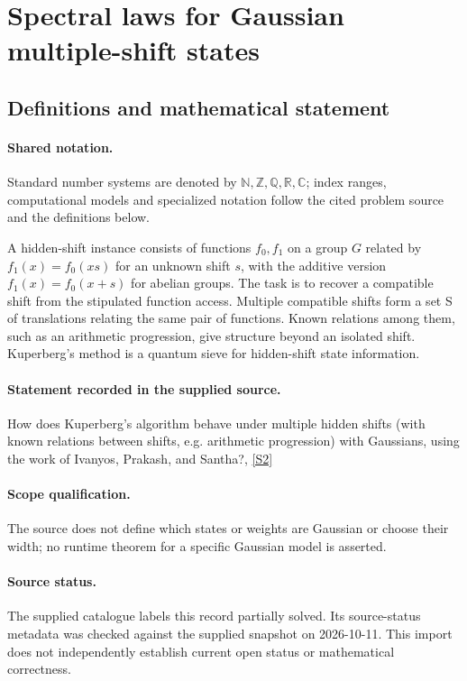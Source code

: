 \documentclass[11pt]{article}
\newcommand{\sref}[2]{\hyperlink{source:#1:#2}{[S#2]}}
\begin{document}
\section{Spectral laws for Gaussian multiple-shift states}\label{statement}

\subsection{Definitions and mathematical statement}

\paragraph{Shared notation.}Standard number systems are denoted by $\mathbb N,\mathbb Z,\mathbb Q,\mathbb R,\mathbb C$; index ranges, computational models and specialized notation follow the cited problem source and the definitions below.


A hidden-shift instance consists of functions $f_0,f_1$ on a group $G$ related by $f_1(x)=f_0(xs)$ for an unknown shift $s$, with the additive version $f_1(x)=f_0(x+s)$ for abelian groups. The task is to recover a compatible shift from the stipulated function access. Multiple compatible shifts form a set S of translations relating the same pair of functions. Known relations among them, such as an arithmetic progression, give structure beyond an isolated shift. Kuperberg's method is a quantum sieve for hidden-shift state information.
\paragraph{Statement recorded in the supplied source.}
How does Kuperberg's algorithm behave under multiple hidden shifts (with known relations between shifts, e.g. arithmetic progression) with Gaussians, using the work of Ivanyos, Prakash, and Santha?, \sref{statement}{2}
\paragraph{Scope qualification.}
The source does not define which states or weights are Gaussian or choose their width; no runtime theorem for a specific Gaussian model is asserted.
\paragraph{Source status.}
The supplied catalogue labels this record partially solved. Its source-status metadata was checked against the supplied snapshot on 2026-10-11. This import does not independently establish current open status or mathematical correctness.
\end{document}
